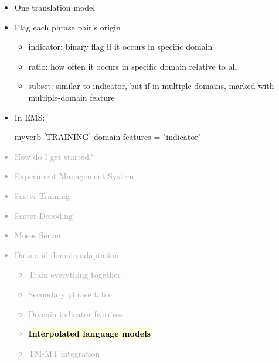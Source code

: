 \documentclass[landscape]{uedslides2C}
\newcommand{\currenttopic}[1]{\colorbox{lightyellow}{\textcolor{black}{\bf #1}}}
\begin{document}

\vspace{15mm}
\begin{itemize} \itemsep 5mm
\item One translation model
\item Flag each phrase pair's origin
\begin{itemize}
\item indicator: binary flag if it occurs in specific domain
\item ratio: how often it occurs in specific domain relative to all
\item subset: similar to indicator, but if in multiple domains, marked with multiple-domain feature
\end{itemize}
\item In EMS:\\[4mm] \small
\begin{SaveVerbatim}{myverb}
  [TRAINING]
  domain-features = "indicator"
\end{SaveVerbatim}
\colorbox{gray}{}
\end{itemize}


\vspace{-5mm}
\textcolor{darkgrey}{
\begin{itemize} \itemsep -1mm
\item {How do I get started?}
\item {Experiment Management System}
\item {Faster Training}
\item {Faster Decoding}
\item {Moses Server}
\item {Data and domain adaptation}
  \begin{itemize} \vspace{-5mm}
  \item {Train everything together}
  \item {Secondary phrase table}
  \item Domain indicator features
\item \currenttopic{Interpolated language models}
  \item TM-MT integration
  \end{itemize}
\end{itemize}
}
\end{document}
